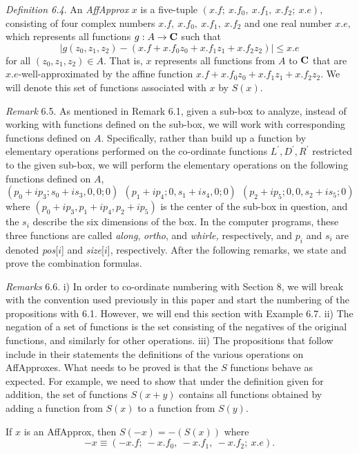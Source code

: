  {\it Definition {\rm 6.4}}.  An {\it AffApprox}  $x$ is a five-tuple
$(x.f;\ x.f_0,\ x.f_1,\ x.f_2;\ x.e),$
consisting of four complex numbers $x.f,\ x.f_0,\ x.f_1,\ x.f_2$ and one real number $x.e,$  which represents all functions 
$g: A \rightarrow {\bf C}$ such that
$$|g(z_0,z_1,z_2) - (x.f + x.f_0 z_0 + x.f_1 z_1 + x.f _2 z_2)| \le x.e$$
for all $(z_0,z_1,z_2) \in A.$  That is, $x$ represents all functions from $A$ to ${\bf C}$ that are $x.e$-well-approximated by the affine function $x.f + x.f_0 z_0 + x.f_1 z_1 + x.f _2 z_2$.  We will denote this set of functions associated with $x$ by $S(x)$.

{\it Remark} 6.5.
As mentioned in Remark 6.1, given a sub-box to analyze, instead of working with functions defined on the sub-box, we will work with corresponding functions defined on $A.$  Specifically, rather than build up a function by elementary operations performed on the co-ordinate functions 
$L^{\prime}, D^{\prime}, R^{\prime}$ 
restricted to the given sub-box, we will perform the elementary operations on the following functions defined on $A$, 
$$(p_0 + i p_3; s_0 + i s_3,0,0; 0)\  \ (p_1 + i p_4; 0, s_1 + i s_4,0;0) \   \ (p_2 + i p_5; 0,0, s_2 + i s_5; 0)$$
where $(p_0 + i p_3, p_1 + i p_4, p_2 + i p_5)$ is the center of the sub-box in question, and the $s_i$ describe the six dimensions of the box. In the computer programs, these three functions are called {\it along}, {\it ortho}, and {\it whirle,} respectively, and $p_i$ and $s_i$
 are denoted {\it pos}[$i$] and {\it size}[$i$], respectively.
After the following remarks, we state and prove the combination formulas. 

 {\it Remarks} 6.6.
i) In order to co-ordinate numbering with Section 8, we will break with the convention used previously in this paper and start the
numbering of the propositions with 6.1. However, we will end this section with Example 6.7.
ii)  The negation of a set of functions is the set consisting of the negatives of the original functions, and similarly for other operations.
iii)  The propositions that follow include in their statements the definitions of the various operations on AffApproxes.  What needs to
be proved is that the $S$ functions behave as expected.  For example, we need to show that under the definition given for addition, the
set of functions $S(x+y)$ contains all functions obtained by adding a function from $S(x)$ to a function from $S(y).$

 If $x$ is an {\rm AffApprox,} then 
$S(-x) = -(S(x))$ where 
$$-x \equiv (-x.f;\ -x.f_0,\ -x.f_1,\ -x.f_2;\ x.e).$$ 
\endproclaim


